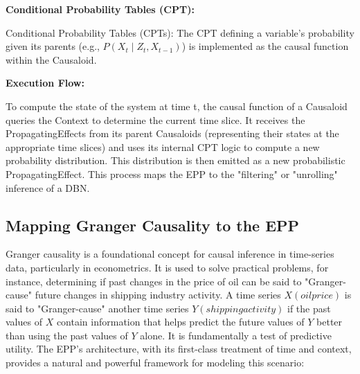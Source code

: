 \textbf{Conditional Probability Tables (CPT):}

Conditional Probability Tables (CPTs): The CPT defining a variable's probability given its parents
(e.g., $P(X_t \mid Z_t, X_{t-1})$) is implemented as the causal function within the Causaloid.


\textbf{Execution Flow:}

To compute the state of the system at time t, the causal function of a Causaloid queries the Context to determine the current time slice. It receives the PropagatingEffects from its parent Causaloids (representing their states at the appropriate time slices) and uses its internal CPT logic to compute a new probability distribution. This distribution is then emitted as a new probabilistic PropagatingEffect. This process maps the EPP to the "filtering" or "unrolling" inference of a DBN.
%
%
\subsection{Mapping Granger Causality to the EPP}
\label{sec:epp_Granger_Causality}

Granger causality is a foundational concept for causal inference in time-series data, particularly in econometrics. It is used to solve practical problems, for instance, determining if past changes in the price of oil can be said to "Granger-cause" future changes in shipping industry activity. 
A time series $X(oil price)$ is said to "Granger-cause" another time series $Y(shipping activity)$ if the past values of  $X$ contain information that helps predict the future values of $Y$ 
 better than using the past values of $Y$ alone. It is fundamentally a test of predictive utility. The EPP's architecture, with its first-class treatment of time and context, provides a natural and powerful framework for modeling this scenario:

